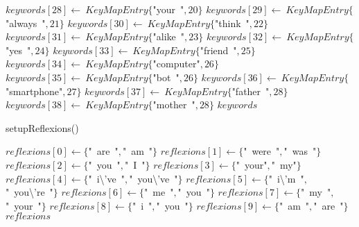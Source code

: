 \documentclass[a4paper,10pt]{article}
\begin{document}
\begin{algorithm}
\begin{algorithmic}[5]
  \STATE \(keywords[28]\gets\ KeyMapEntry\{\)"{}your\ "{}\(,20\}\)
  \STATE \(keywords[29]\gets\ KeyMapEntry\{\)"{}always\ "{}\(,21\}\)
  \STATE \(keywords[30]\gets\ KeyMapEntry\{\)"{}think\ "{}\(,22\}\)
  \STATE \(keywords[31]\gets\ KeyMapEntry\{\)"{}alike\ "{}\(,23\}\)
  \STATE \(keywords[32]\gets\ KeyMapEntry\{\)"{}yes\ "{}\(,24\}\)
  \STATE \(keywords[33]\gets\ KeyMapEntry\{\)"{}friend\ "{}\(,25\}\)
  \STATE \(keywords[34]\gets\ KeyMapEntry\{\)"{}computer"{}\(,26\}\)
  \STATE \(keywords[35]\gets\ KeyMapEntry\{\)"{}bot\ "{}\(,26\}\)
  \STATE \(keywords[36]\gets\ KeyMapEntry\{\)"{}smartphone"{}\(,27\}\)
  \STATE \(keywords[37]\gets\ KeyMapEntry\{\)"{}father\ "{}\(,28\}\)
  \STATE \(keywords[38]\gets\ KeyMapEntry\{\)"{}mother\ "{}\(,28\}\)
  \RETURN\(keywords\)

\end{algorithmic}
\end{algorithm}


\begin{algorithm}
\caption{setupReflexions()}
\begin{algorithmic}[5]

\STATE {}
  \STATE \(reflexions[0]\gets\{\)"{}\ are\ "{}\(,\)"{}\ am\ "{}\(\}\)
  \STATE \(reflexions[1]\gets\{\)"{}\ were\ "{}\(,\)"{}\ was\ "{}\(\}\)
  \STATE \(reflexions[2]\gets\{\)"{}\ you\ "{}\(,\)"{}\ I\ "{}\(\}\)
  \STATE \(reflexions[3]\gets\{\)"{}\ your"{}\(,\)"{}\ my"{}\(\}\)
  \STATE \(reflexions[4]\gets\{\)"{}\ i\textbackslash{}'{}ve\ "{}\(,\)"{}\ you\textbackslash{}'{}ve\ "{}\(\}\)
  \STATE \(reflexions[5]\gets\{\)"{}\ i\textbackslash{}'{}m\ "{}\(,\)"{}\ you\textbackslash{}'{}re\ "{}\(\}\)
  \STATE \(reflexions[6]\gets\{\)"{}\ me\ "{}\(,\)"{}\ you\ "{}\(\}\)
  \STATE \(reflexions[7]\gets\{\)"{}\ my\ "{}\(,\)"{}\ your\ "{}\(\}\)
  \STATE \(reflexions[8]\gets\{\)"{}\ i\ "{}\(,\)"{}\ you\ "{}\(\}\)
  \STATE \(reflexions[9]\gets\{\)"{}\ am\ "{}\(,\)"{}\ are\ "{}\(\}\)
  \RETURN\(reflexions\)

\end{algorithmic}
\end{algorithm}
\end{document}
